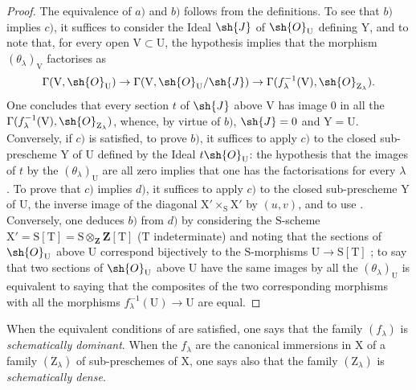 \begin{proof}
The equivalence of $a)$ and $b)$ follows from the definitions.
To see that $b)$ implies $c)$, it suffices to consider the Ideal $\sh{J}$ of $\sh{O}_\mathrm{U}$ defining $\mathrm{Y}$, and to note that, for every open $\mathrm{V}\subset\mathrm{U}$, the hypothesis implies that the morphism $(\theta_\lambda)_\mathrm{V}$ factorises as
\[
  \Gamma(\mathrm{V},\sh{O}_\mathrm{U})\to\Gamma(\mathrm{V},\sh{O}_\mathrm{U}/\sh{J})\to\Gamma(f_\lambda^{-1}(\mathrm{V}),\sh{O}_{\mathrm{Z}_\lambda}).
\]
One concludes that every section $t$ of $\sh{J}$ above $\mathrm{V}$ has image $0$ in all the $\Gamma(f_\lambda^{-1}(\mathrm{V}),\sh{O}_{\mathrm{Z}_\lambda})$, whence, by virtue of $b)$, $\sh{J}=0$ and $\mathrm{Y}=\mathrm{U}$.
Conversely, if $c)$ is satisfied, to prove $b)$, it suffices to apply $c)$ to the closed sub-prescheme $\mathrm{Y}$ of $\mathrm{U}$ defined by the Ideal $t\sh{O}_\mathrm{U}$: the hypothesis that the images of $t$ by the $(\theta_\lambda)_\mathrm{U}$ are all zero implies that one has the factorisations  for every $\lambda$ .
To prove that $c)$ implies $d)$, it suffices to apply $c)$ to the closed sub-prescheme $\mathrm{Y}$ of $\mathrm{U}$, the inverse image of the diagonal $\mathrm{X}'\times_\mathrm{S}\mathrm{X}'$ by $(u,v)$, and to use .
Conversely, one deduces $b)$ from $d)$ by considering the $\mathrm{S}$-scheme $\mathrm{X}'=\mathrm{S}[\mathrm{T}]=\mathrm{S}\otimes_\mathbf{Z}\mathbf{Z}[\mathrm{T}]$ ($\mathrm{T}$ indeterminate) and noting that the sections of $\sh{O}_\mathrm{U}$ above $\mathrm{U}$ correspond bijectively to the $\mathrm{S}$-morphisms $\mathrm{U}\to\mathrm{S}[\mathrm{T}]$ ; to say that two sections of $\sh{O}_\mathrm{U}$ above $\mathrm{U}$ have the same images by all the $(\theta_\lambda)_\mathrm{U}$ is equivalent to saying that the composites of the two corresponding morphisms with all the morphisms $f_\lambda^{-1}(\mathrm{U})\to\mathrm{U}$ are equal.
\end{proof}

\begin{definition}[11.10.2]
\label{IV.11.10.2}
When the equivalent conditions of  are satisfied, one says that the family $(f_\lambda)$ is \emph{schematically dominant}.
When the $f_\lambda$ are the canonical immersions in $\mathrm{X}$ of a family $(\mathrm{Z}_\lambda)$ of sub-preschemes of $\mathrm{X}$, one says also that the family $(\mathrm{Z}_\lambda)$ is \emph{schematically dense}.
\end{definition}

